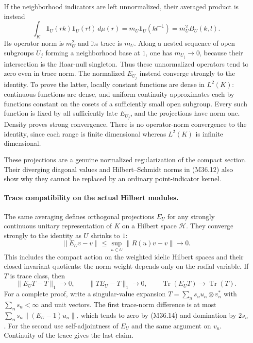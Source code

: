 If the neighborhood indicators are left unnormalized,
their averaged product is instead
\[
 \int_K\mathbf1_U(rk)\mathbf1_U(rl)\,d\mu(r)
       =m_U\mathbf1_U(kl^{-1})=m_U^2 B_U(k,l).
 \tag{M36.13}
\]
Its operator norm is $m_U^2$ and its trace is $m_U$.
Along a nested sequence of open subgroups $U_j$ forming
a neighborhood base at $1$, one has $m_{U_j}\to0$,
because their intersection is the Haar-null singleton.
Thus these unnormalized operators tend to zero even
in trace norm.  The normalized $E_{U_j}$ instead
converge strongly to the identity.  To prove the latter,
locally constant functions are dense in $L^2(K)$:
continuous functions are dense, and uniform continuity
approximates each by functions constant on the cosets
of a sufficiently small open subgroup.  Every such
function is fixed by all sufficiently late $E_{U_j}$,
and the projections have norm one.  Density proves
strong convergence.  There is no operator-norm
convergence to the identity, since each range is finite
dimensional whereas $L^2(K)$ is infinite dimensional.

These projections are a genuine normalized regularization
of the compact section.  Their diverging diagonal values
and Hilbert--Schmidt norms in (M36.12) also show why they
cannot be replaced by an ordinary point-indicator kernel.

\paragraph{Trace compatibility on the actual Hilbert modules.}
The same averaging defines orthogonal projections $E_U$
for any strongly continuous unitary representation of
$K$ on a Hilbert space $\mathcal H$.  They converge
strongly to the identity as $U$ shrinks to $1$:
\[
 \|E_Uv-v\|
       \le\sup_{u\in U}\|R(u)v-v\|\longrightarrow0.
 \tag{M36.14}
\]
This includes the compact action on the weighted idelic
Hilbert spaces and their closed invariant quotients:
the norm weight depends only on the radial variable.
If $T$ is trace class, then
\[
 \|E_UT-T\|_1\to0,\qquad
 \|TE_U-T\|_1\to0,\qquad
             \operatorname{Tr}(E_UT)\to\operatorname{Tr}(T).
 \tag{M36.15}
\]
For a complete proof, write a singular-value expansion
$T=\sum_ns_n u_n\otimes v_n^*$ with
$\sum_ns_n<\infty$ and unit vectors.  The first
trace-norm difference is at most
$\sum_ns_n\|(E_U-1)u_n\|$, which tends to zero by
(M36.14) and domination by $2s_n$.  For the second
use self-adjointness of $E_U$ and the same argument
on $v_n$.  Continuity of the trace gives the last claim.

